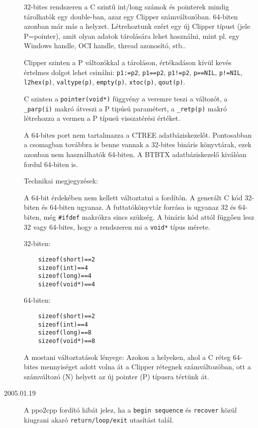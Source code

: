 \begin{description}
    32-bites rendszeren a C szintű int/long számok és pointerek 
    mindig tárolhatók egy double-ban, azaz egy Clipper számváltozóban.
    64-biten azonban már más a helyzet. Létrehoztunk ezért egy új Clipper 
    típust (jele P=pointer), amit olyan adatok tárolására lehet használni,
    mint pl. egy Windows handle, OCI handle,  thread azonosító, stb..
    
    Clipper szinten a P változókkal a tároláson, értékadáson
    kívül kevés  értelmes dolgot lehet csinálni:
    \verb!p1:=p2!,
    \verb!p1==p2!, \verb|p1!=p2|, 
    \verb|p==NIL|, \verb|p!=NIL|, 
    \verb!l2hex(p)!, 
    \verb!valtype(p)!, 
    \verb!empty(p)!, 
    \verb!xtoc(p)!, 
    \verb!qout(p)!.
    
    C szinten a \verb!pointer(void*)! függvény a veremre teszi a változót,
    a \verb!_parp(i)! makró átveszi a P tipúsú paramétert, 
    a \verb!_retp(p)! makró létrehozza a vermen a P típusú visszatérési értéket.
    
    A 64-bites port nem tartalmazza a CTREE adatbáziskezelőt. 
    Pontosabban a csomagban továbbra is benne vannak a 32-bites
    bináris könyvtárak, ezek azonban nem használhatók 64-biten.
    A BTBTX adatbáziskezelő kiválóan fordul 64-biten is. 
    
    Technikai megjegyzések: 
    
    A 64-bit érdekében nem kellett változtatni a fordítón. 
    A generált C kód 32-biten és 64-biten ugyanaz. A futtatókönyvtár 
    forrása is ugyanaz 32 és 64-biten, még \verb!#ifdef! makrókra sincs 
    szükség.  A bináris kód attól függően lesz 32 vagy 64-bites, 
    hogy a rendszeren  mi a \verb!void*! típus mérete.
    
    32-biten:
    \begin{verbatim}
    sizeof(short)==2
    sizeof(int)==4
    sizeof(long)==4
    sizeof(void*)==4
    \end{verbatim}

    64-biten:
    \begin{verbatim}
    sizeof(short)==2
    sizeof(int)==4
    sizeof(long)==8
    sizeof(void*)==8
    \end{verbatim}
    
    A mostani változtatások lényege: 
    Azokon a helyeken, ahol a C réteg 64-bites mennyiséget adott
    volna át a Clipper rétegnek számváltozóban, ott a számváltozó (N)
    helyett az új pointer (P) típusra tértünk át.
\item[2005.01.19]
    A ppo2cpp fordító hibát jelez, 
    ha a \verb!begin sequence! és \verb!recover! közül kiugrani
    akaró \verb!return/loop/exit! utasítást talál.
    

\end{description}
